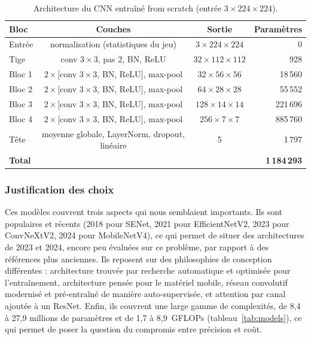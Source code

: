 \begin{table}[htbp]
\centering
\caption{Architecture du CNN entraîné from scratch (entrée $3\times224\times224$).}
\label{tab:scratch}
\begin{tabular}{lccr}
\toprule
\textbf{Bloc} & \textbf{Couches} & \textbf{Sortie} & \textbf{Paramètres} \\
\midrule
Entrée & normalisation (statistiques du jeu) & $3\times224\times224$ & 0 \\
Tige & conv $3\times3$, pas 2, BN, ReLU & $32\times112\times112$ & 928 \\
Bloc 1 & $2\times$[conv $3\times3$, BN, ReLU], max-pool & $32\times56\times56$ & 18\,560 \\
Bloc 2 & $2\times$[conv $3\times3$, BN, ReLU], max-pool & $64\times28\times28$ & 55\,552 \\
Bloc 3 & $2\times$[conv $3\times3$, BN, ReLU], max-pool & $128\times14\times14$ & 221\,696 \\
Bloc 4 & $2\times$[conv $3\times3$, BN, ReLU], max-pool & $256\times7\times7$ & 885\,760 \\
Tête & moyenne globale, LayerNorm, dropout, linéaire & 5 & 1\,797 \\
\midrule
\textbf{Total} & & & \textbf{1\,184\,293} \\
\bottomrule
\end{tabular}
\end{table}

\subsubsection{Justification des choix}

Ces modèles couvrent trois aspects qui nous semblaient importants. Ils sont populaires et récents (2018 pour SENet, 2021 pour EfficientNetV2, 2023 pour ConvNeXtV2, 2024 pour MobileNetV4), ce qui permet de situer des architectures de 2023 et 2024, encore peu évaluées sur ce problème, par rapport à des références plus anciennes. Ils reposent sur des philosophies de conception différentes : architecture trouvée par recherche automatique et optimisée pour l'entraînement, architecture pensée pour le matériel mobile, réseau convolutif modernisé et pré-entraîné de manière auto-supervisée, et attention par canal ajoutée à un ResNet. Enfin, ils couvrent une large gamme de complexités, de 8,4 à 27,9 millions de paramètres et de 1,7 à 8,9~GFLOPs (tableau~\ref{tab:models}), ce qui permet de poser la question du compromis entre précision et coût.


